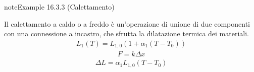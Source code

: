 \documentclass[letterpaper,10pt,italian]{jupyterBook}
\begin{document}
\begin{sphinxadmonition}{note}{Example 16.3.3 (Calettamento)}



\sphinxAtStartPar
Il calettamento a caldo o a freddo è un’operazione di unione di due componenti con una connessione a incastro, che sfrutta la dilatazione termica dei materiali.  
\begin{equation*}
\begin{split}L_1(T) = L_{1,0} (1 + \alpha_1 (T-T_0))\end{split}
\end{equation*}\begin{equation*}
\begin{split}F = k \Delta x\end{split}
\end{equation*}\begin{equation*}
\begin{split}\Delta L = \alpha_1 L_{1,0} ( T - T_0 )\end{split}
\end{equation*}\end{sphinxadmonition}

\sphinxstepscope
\end{document}
